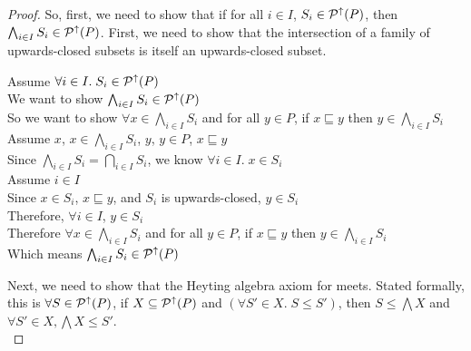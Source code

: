 \begin{proof}
So, first, we need to show that if for all $i \in I$, $S_i \in \mathcal{P}^{\uparrow}({P})$, 
then $\bigwedge_{i \in I} S_i \in \mathcal{P}^{\uparrow}({P})$. First, we need to show that 
the intersection of a family of upwards-closed subsets is itself an
upwards-closed subset. 

\begin{tabbedproof}
\oo Assume $\forall i \in I.\; S_i \in \mathcal{P}^{\uparrow}({P})$ \\
\ooo We want to show $\bigwedge_{i \in I} S_i \in \mathcal{P}^{\uparrow}({P})$ \\ 
\ooo So we want to show $\forall x \in \bigwedge_{i \in I} S_i$ and for all $y \in P$, if $x \sqsubseteq y$ then $y \in \bigwedge_{i \in I} S_i$ \\
\ooo Assume $x$, $x \in \bigwedge_{i \in I} S_i$, $y$, $y \in P$, $x \sqsubseteq y$ \\
\oooo Since $\bigwedge_{i \in I} S_i = \bigcap_{i \in I} S_i$, we know 
      $\forall i \in I.\; x \in S_i$ \\
\oooo Assume $i \in I$ \\
\ooooo Since $x \in S_i$, $x \sqsubseteq y$, and $S_i$ is upwards-closed, $y \in S_i$ \\
\oooo Therefore, $\forall i \in I$, $y \in S_i$ \\
\ooo Therefore $\forall x \in \bigwedge_{i \in I} S_i$ and for all $y \in P$, if $x \sqsubseteq y$ then $y \in \bigwedge_{i \in I} S_i$ \\
\ooo Which means $\bigwedge_{i \in I} S_i \in \mathcal{P}^{\uparrow}({P})$ \\ 
\end{tabbedproof}

\noindent Next, we need to show that the Heyting algebra axiom for meets. 
Stated formally,
this is $\forall S \in \mathcal{P}^{\uparrow}({P})$, if $X \subseteq
\mathcal{P}^{\uparrow}({P})$ and $(\forall S' \in X.\; S \leq S')$, then $S
\leq \bigwedge X$ and $\forall S' \in X, \bigwedge X \leq S'$.
\\


\end{proof}
